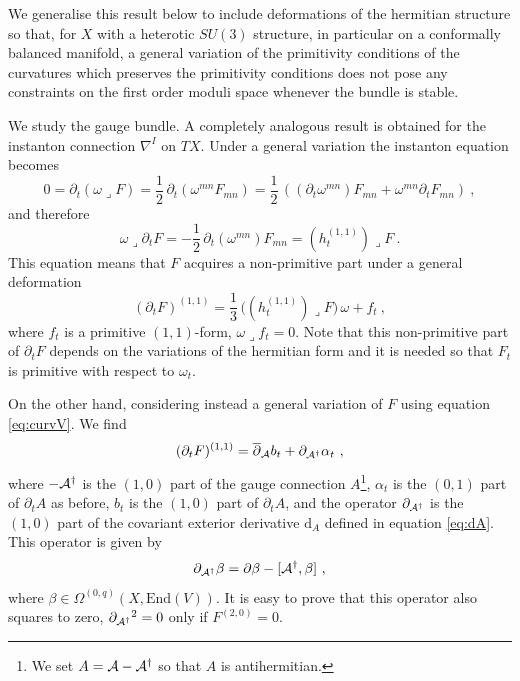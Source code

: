 \documentclass[12pt,a4paper]{article}
\newcommand{\half}{\frac{1}{2}}
\def\bar#1{\overline{#1}}
\let\p=\partial
\def\d{\textrm{d}}
\def\End{\textrm{End}}
\def\bp{\bar{\partial}}
\theoremstyle{definition}
\begin{document}
We generalise this result below to include deformations of the hermitian structure so that, for $X$ with a heterotic $SU(3)$ structure, in particular on a conformally balanced manifold, a general variation of the primitivity conditions of the curvatures which preserves the primitivity conditions does not pose  any constraints on the first order moduli space whenever the bundle is stable. 

We study the gauge bundle. A completely analogous result is obtained for the instanton connection $\nabla^I$ on $TX$.
Under a general variation the instanton equation becomes
\[0 = \p_t(\omega\lrcorner F)
= \half\,\p_t\left(\omega^{mn}F_{mn}\right)
= \half\, \left((\p_t\omega^{mn})  F_{mn} + \omega^{mn}\p_t F_{mn}\right)
~, \]
and therefore
\begin{equation}
 \omega\lrcorner \p_t F = -  \half\, \p_t(\omega^{mn})  F_{mn} =   (h_t^{(1,1)})\lrcorner F ~.
  \label{eq:varinstone}
 \end{equation}
 This equation means that $F$ acquires a non-primitive part under a general deformation
 \[(\partial_t F)^{(1,1)} = \frac{1}{3}\, \big((h_t^{(1,1)})\lrcorner F\big)\, \omega + f_t~,\]
 where $f_t$ is a primitive $(1,1)$-form, $\omega\lrcorner f_t = 0$. 
 Note that this non-primitive part of $\p_t F$ depends on the variations of the hermitian form
 and it is needed so that $F_t$ is primitive with respect to $\omega_t$.
 
On the other hand, considering instead a general variation of $F$ using equation \eqref{eq:curvV}. We find
\begin{equation}
(\partial_t F)^{(1,1)} =  \bp_{\cal A} b_t + \p_{{\cal A}^\dagger} \alpha_t~,\label{eq:varinsttwo}
\end{equation}
where $- {\cal A}^\dagger$ is the $(1,0)$ part of the gauge connection $A$\footnote{We set $A = {\cal A} - {\cal A}^\dagger$ so that $A$ is antihermitian.}, $\alpha_t$ is the $(0,1)$ part of $\p_t A$ as before, $b_t$ is the $(1,0)$ part of $\p_t A$, and the operator  $\p_{{\cal A}^\dagger}$ is the $(1,0)$ part of the covariant exterior derivative $\d_A$ defined in equation \eqref{eq:dA}.  This operator is given by
\begin{equation} 
\partial_{{\cal A}^\dagger} \beta = \p\beta - [{\cal A}^\dagger, \beta] ~,
\label{eq:pAdag}
\end{equation}
where $\beta\in \Omega^{(0,q)}(X, \End(V))$. 
It is easy to prove that this operator also squares to zero, $\p_{{\cal A}^\dagger}{}^2 = 0$ only if $F^{(2,0)} = 0$. 
\end{document}
